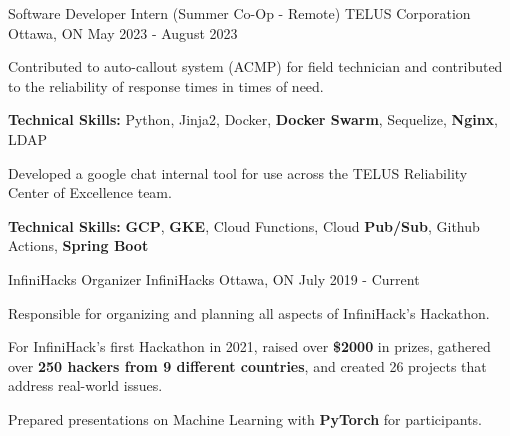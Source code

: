 

\begin{cventries}

  \cventry
    {Software Developer Intern (Summer Co-Op - Remote)} %
    {TELUS Corporation} %
    {Ottawa, ON} %
    {May 2023 - August 2023} %
    {
      \begin{cvitems} %
        \item {Contributed to auto-callout system (ACMP) for field technician and contributed to the reliability of response times in times of need.}
          \item[] {\textbf{Technical Skills:} Python, Jinja2, Docker, \textbf{Docker Swarm}, Sequelize, \textbf{Nginx}, LDAP}
        \item {Developed a google chat internal tool for use across the TELUS Reliability Center of Excellence team.}
          \item[] {\textbf{Technical Skills:} \textbf{GCP}, \textbf{GKE}, Cloud Functions, Cloud \textbf{Pub/Sub}, Github Actions, \textbf{Spring Boot}}
      \end{cvitems}
    }

  \cventry
    {InfiniHacks Organizer} %
    {InfiniHacks} %
    {Ottawa, ON} %
    {July 2019 - Current} %
    {
      \begin{cvitems} %
        \item {Responsible for organizing and planning all aspects of InfiniHack's Hackathon.}
        \item {For InfiniHack's first Hackathon in 2021, raised over \textbf{\$2000} in prizes, gathered over \textbf{250 hackers from 9 different countries}, and created 26 projects that address real-world issues.}
        \item {Prepared presentations on Machine Learning with \textbf{PyTorch} for participants.}
      \end{cvitems}
    }


\end{cventries}

